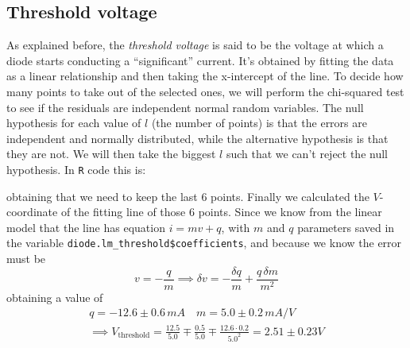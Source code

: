 \subsection{Threshold voltage}
As explained before, the \emph{threshold voltage} is said to be the voltage at
which a diode starts conducting a ``significant'' current. It's obtained by
fitting the data as a linear relationship and then taking the x-intercept of the
line. To decide how many points to take out of the selected ones, we will
perform the chi-squared test to see if the residuals are independent normal
random variables. The null hypothesis for each value of \(l\) (the number of
points) is that the errors are independent and normally distributed, while the
alternative hypothesis is that they are not. We will then take the biggest \(l\)
such that we can't reject the null hypothesis. In \texttt{R} code this is:

obtaining that we need to keep the last 6 points. Finally we calculated the
\(V\)-coordi\-nate of the fitting line of those 6 points. Since we know from the
linear model that the line has equation \(i = mv + q\), with \(m\) and \(q\)
parameters saved in the variable \texttt{diode.lm\_threshold\$coefficients}, and
because we know the error must be 
\[
    v = -\frac{q}{m} \implies \delta v = -\frac{\delta q}{m} + \frac{q\,\delta m}{m^2}
\]
obtaining a value of 
\begin{align*}
    q = -12.6 \pm 0.6 \,mA \quad m = 5.0 \pm 0.2 \,mA / V \\
    \implies V_{\text{threshold}} = \frac{12.5}{5.0} \mp \frac{0.5}{5.0} \mp
    \frac{12.6 \cdot 0.2}{5.0^2} = 2.51 \pm 0.23 V
\end{align*}

